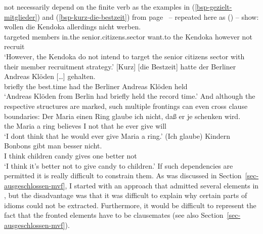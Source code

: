 not necessarily depend on the finite verb as the examples in (\ref{bsp-gezielt-mitglieder}) and
(\ref{bsp-kurz-die-bestzeit}) from page~\pageref{bsp-gezielt-mitglieder} -- repeated
here as () -- show:
\eal
\ex
\gll [Gezielt] [Mitglieder] [im     Seniorenbereich]       wollen  die Kendoka allerdings nicht werben.\footnotemark\\
    \spacebr{}targeted \spacebr{}members     \spacebr{}in.the senior.citizens.sector want.to the Kendoka however    not   recruit\\
\glt `However, the Kendoka do not intend to target the senior citizens sector with their member recruitment strategy.'%
\label{bsp-gezielt-mitglieder-zwei}
\ex 
\gll {}[Kurz] [die Bestzeit] hatte der Berliner Andreas Klöden [\ldots] gehalten.\footnotemark\\
	 \spacebr{}briefly \spacebr{}the best.time had the Berliner Andreas Klöden {} held\\
\label{bsp-kurz-die-bestzeit-zwei}     
\glt `Andreas Klöden from Berlin had briefly held the record time.'
\zl
And although the respective structures are marked, such multiple frontings can even cross clause boundaries:
\eal
\label{ex-der-maria-einen-ring}
\ex 
\gll Der Maria einen Ring glaube ich nicht, daß er je schenken wird.\footnotemark\\
	 the Maria a ring believes I not that he ever give will\\
\glt `I dont think that he would ever give Maria a ring.'
\ex 
\gll (Ich glaube) Kindern Bonbons gibt man besser nicht.\footnotemark\\
     I think children candy gives one better not\\
\glt `I think it's better not to give candy to children.'
\zl
If such dependencies are permitted it is really difficult to constrain them. As was discussed in
Section~\ref{sec-ausgeschlossen-mvf}, I started with an approach that admitted several elements in \slasch, but the
disadvantage was that it was difficult to explain why certain parts of idioms could not be
extracted. Furthermore, it would be difficult to represent the fact that the fronted elements have
to be clausemates (see also Section~\ref{sec-ausgeschlossen-mvf}).

